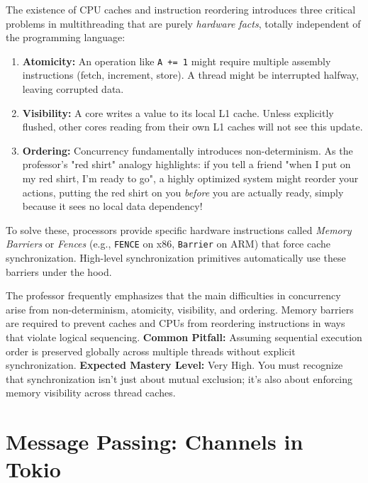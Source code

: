 \begin{warningbox}
The existence of CPU caches and instruction reordering introduces three critical problems in multithreading that are purely \textit{hardware facts}, totally independent of the programming language:
\begin{enumerate}
    \item \textbf{Atomicity:} An operation like \texttt{A += 1} might require multiple assembly instructions (fetch, increment, store). A thread might be interrupted halfway, leaving corrupted data.
    \item \textbf{Visibility:} A core writes a value to its local L1 cache. Unless explicitly flushed, other cores reading from their own L1 caches will not see this update.
    \item \textbf{Ordering:} Concurrency fundamentally introduces non-determinism. As the professor's "red shirt" analogy highlights: if you tell a friend "when I put on my red shirt, I'm ready to go", a highly optimized system might reorder your actions, putting the red shirt on you \textit{before} you are actually ready, simply because it sees no local data dependency!
\end{enumerate}
To solve these, processors provide specific hardware instructions called \textit{Memory Barriers} or \textit{Fences} (e.g., \texttt{FENCE} on x86, \texttt{Barrier} on ARM) that force cache synchronization. High-level synchronization primitives automatically use these barriers under the hood.
\end{warningbox}

\begin{examprioritybox}
The professor frequently emphasizes that the main difficulties in concurrency arise from non-determinism, atomicity, visibility, and ordering. Memory barriers are required to prevent caches and CPUs from reordering instructions in ways that violate logical sequencing.
\textbf{Common Pitfall:} Assuming sequential execution order is preserved globally across multiple threads without explicit synchronization.
\textbf{Expected Mastery Level:} Very High. You must recognize that synchronization isn't just about mutual exclusion; it's also about enforcing memory visibility across thread caches.
\end{examprioritybox}


\section{Message Passing: Channels in Tokio}

